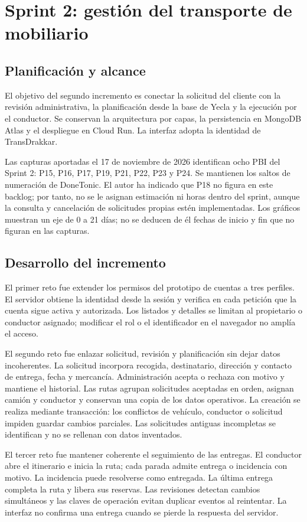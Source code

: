 \clearpage
\raggedbottom
\section{Sprint 2: gestión del transporte de mobiliario}
\subsection{Planificación y alcance}
El objetivo del segundo incremento es conectar la solicitud del cliente con la revisión administrativa, la planificación desde la base de Yecla y la ejecución por el conductor. Se conservan la arquitectura por capas, la persistencia en MongoDB Atlas y el despliegue en Cloud Run. La interfaz adopta la identidad de TransDrakkar.

Las capturas aportadas el 17 de noviembre de 2026 identifican ocho PBI del Sprint 2: P15, P16, P17, P19, P21, P22, P23 y P24. Se mantienen los saltos de numeración de DoneTonic. El autor ha indicado que P18 no figura en este backlog; por tanto, no se le asignan estimación ni horas dentro del sprint, aunque la consulta y cancelación de solicitudes propias estén implementadas. Los gráficos muestran un eje de 0 a 21 días; no se deducen de él fechas de inicio y fin que no figuran en las capturas.

\subsection{Desarrollo del incremento}
El primer reto fue extender los permisos del prototipo de cuentas a tres perfiles. El servidor obtiene la identidad desde la sesión y verifica en cada petición que la cuenta sigue activa y autorizada. Los listados y detalles se limitan al propietario o conductor asignado; modificar el rol o el identificador en el navegador no amplía el acceso.

El segundo reto fue enlazar solicitud, revisión y planificación sin dejar datos incoherentes. La solicitud incorpora recogida, destinatario, dirección y contacto de entrega, fecha y mercancía. Administración acepta o rechaza con motivo y mantiene el historial. Las rutas agrupan solicitudes aceptadas en orden, asignan camión y conductor y conservan una copia de los datos operativos. La creación se realiza mediante transacción: los conflictos de vehículo, conductor o solicitud impiden guardar cambios parciales. Las solicitudes antiguas incompletas se identifican y no se rellenan con datos inventados.

El tercer reto fue mantener coherente el seguimiento de las entregas. El conductor abre el itinerario e inicia la ruta; cada parada admite entrega o incidencia con motivo. La incidencia puede resolverse como entregada. La última entrega completa la ruta y libera sus reservas. Las revisiones detectan cambios simultáneos y las claves de operación evitan duplicar eventos al reintentar. La interfaz no confirma una entrega cuando se pierde la respuesta del servidor.

